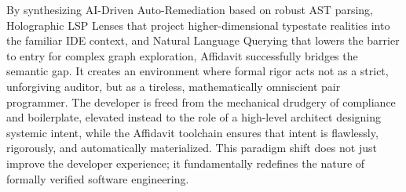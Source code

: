 By synthesizing AI-Driven Auto-Remediation based on robust AST parsing, Holographic LSP Lenses that project higher-dimensional typestate realities into the familiar IDE context, and Natural Language Querying that lowers the barrier to entry for complex graph exploration, Affidavit successfully bridges the semantic gap. It creates an environment where formal rigor acts not as a strict, unforgiving auditor, but as a tireless, mathematically omniscient pair programmer. The developer is freed from the mechanical drudgery of compliance and boilerplate, elevated instead to the role of a high-level architect designing systemic intent, while the Affidavit toolchain ensures that intent is flawlessly, rigorously, and automatically materialized. This paradigm shift does not just improve the developer experience; it fundamentally redefines the nature of formally verified software engineering.
